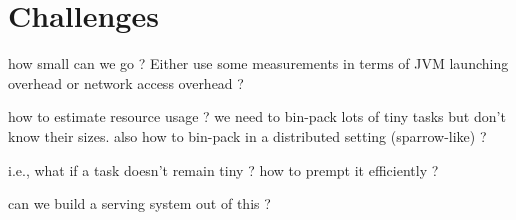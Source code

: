 \section{Challenges}

\begin{myitemize}
  \item how small can we go ? Either use some measurements in terms of JVM
    launching overhead or network access overhead ?
  \item how to estimate resource usage ? we need to bin-pack lots of tiny tasks
    but don't know their sizes. also how to bin-pack in a distributed setting
    (sparrow-like) ?
  \item i.e., what if a task doesn't remain tiny ? how to prempt it efficiently ? 
  \item can we build a serving system out of this ? 
\end{myitemize}

